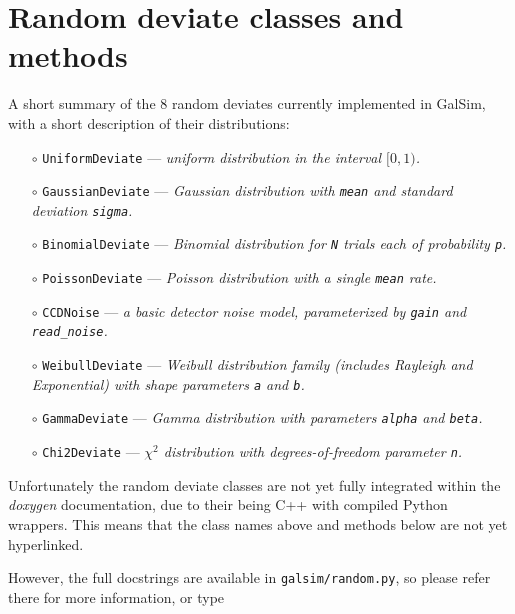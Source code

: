 \documentclass[preprint,11pt]{aastex}
\begin{document}
\section{Random deviate classes and methods}\label{sect:random}
A short summary of the 8 random deviates currently implemented in GalSim,
with a short description of their distributions:
\begin{itemize}

\item[$\circ$] \texttt{UniformDeviate} --- \emph{uniform distribution in the
  interval $[0, 1)$.}

\item[$\circ$] \texttt{GaussianDeviate} --- \emph{Gaussian distribution
with \texttt{mean} and standard deviation \texttt{sigma}.}

\item[$\circ$] \texttt{BinomialDeviate} --- \emph{Binomial
    distribution for \texttt{N} trials each of probability \texttt{p}.}

\item[$\circ$] \texttt{PoissonDeviate} --- \emph{Poisson distribution
    with a single \texttt{mean} rate.}

\item[$\circ$] \texttt{CCDNoise}  --- \emph{a
    basic detector noise model, parameterized by \texttt{gain} and \texttt{read\_noise}.}

\item[$\circ$] \texttt{WeibullDeviate} --- \emph{Weibull distribution
    family (includes Rayleigh and Exponential) with shape parameters \texttt{a} and \texttt{b}.}

\item[$\circ$] \texttt{GammaDeviate} --- \emph{Gamma distribution with
    parameters \texttt{alpha} and \texttt{beta}.}

\item[$\circ$] \texttt{Chi2Deviate} --- \emph{$\chi^2$ distribution
    with degrees-of-freedom parameter \texttt{n}.}

\end{itemize}

Unfortunately the random deviate classes are not yet fully integrated within
the \emph{doxygen} documentation, due to their being C++ with compiled
Python wrappers.  This means that the class names above and methods
below are not yet hyperlinked.

However, the full docstrings are available in
\texttt{galsim/random.py}, so please refer there for more information,
or type
\end{document}
